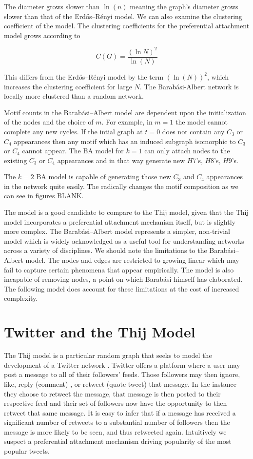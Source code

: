The diameter grows slower than $\ln(n)$ meaning the graph's diameter grows slower than that of the 
Erdős–Rényi model. We can also examine the clustering coefficient of the model. 
The clustering coefficients for the preferential attachment model grows according to

$$
C(G) = \frac{(\ln N)^2}{\ln (N)}
$$

This differs from the Erdős–Rényi model by the term $(\ln (N))^2$,
which increases the clustering coefficient for large $N$.
The Barabási-Albert network is locally more clustered than a random network.

Motif counts in the Barabási–Albert model are dependent upon the initialization of the nodes 
and the choice of $m$. For example, in $m=1$ the model cannot complete any new cycles. If the
intial graph at $t=0$ does not contain any $C_3$ or $C_4$ appearances then any motif 
which has an induced subgraph isomorphic to $C_3$ or $C_4$ cannot appear. The BA model 
for $k=1$ can only attach nodes to the existing  $C_3$ or $C_4$ appearances and in that 
way generate new $H7$'s, $H8$'s, $H9$'s. 

The $k=2$ BA model is capable of generating those new $C_3$ and $C_4$ appearances in the network 
quite easily. The radically changes the motif composition as we can see in figures BLANK.


The model is a good candidate to compare to the Thij model, given that the Thij model incorporates
a preferential attachment mechanism itself, but is slightly more complex. The Barabási–Albert model 
represents a simpler, non-trivial model which is widely acknowledged as a useful tool
for understanding networks across a variety of disciplines. We should note the 
limitations to the Barabási–Albert model. The nodes and edges are restricted to growing linear which
may fail to capture certain phenomena that appear empirically. The model is also incapable
 of removing nodes, a point on which Barabási himself has elaborated. The following model
 does account for these limitations at the cost of increased complexity.

\chapter{Twitter and the Thij Model}
\label{section:Thij model}
The Thij model is a particular random graph that seeks to model the development of a Twitter network 
 \cite{thij}. Twitter offers a platform where a user may post a message
to all of their followers' feeds. Those followers may then ignore, like, reply (comment) , or retweet (quote tweet) that message. In the
instance they choose to retweet the message, that message is then posted to their respective feed and their
set of followers now have the opportunity to then retweet that same message. It is easy to infer that if a 
message has received a significant number of retweets to a substantial number of followers
 then the message is more likely to be seen, and thus
retweeted again. Intuitively we suspect a preferential attachment mechanism driving popularity of the most popular tweets.

